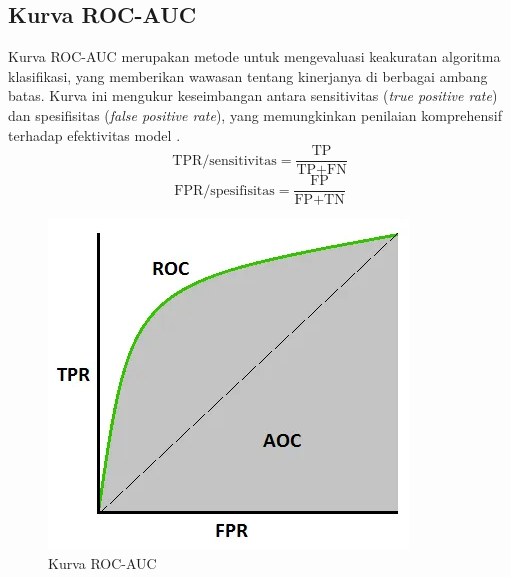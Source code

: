     \subsection{Kurva ROC-AUC}
    Kurva ROC-AUC merupakan metode untuk mengevaluasi keakuratan algoritma klasifikasi, yang memberikan wawasan tentang kinerjanya di berbagai ambang batas. Kurva ini mengukur keseimbangan antara sensitivitas (\textit{true positive rate}) dan spesifisitas (\textit{false positive rate}), yang memungkinkan penilaian komprehensif terhadap efektivitas model \cite{10420319}.
\begin{equation}
   \text{TPR/sensitivitas} = \frac{\text{TP}}{\text{TP} + \text{FN}}
   \label{eq:tpr}
\end{equation}
\begin{equation}
   \text{FPR/spesifisitas} = \frac{\text{FP}}{\text{FP} + \text{TN}}
   \label{eq:fpr}
\end{equation}
\begin{figure}[H]
    \centering
    \includegraphics[width=0.4\linewidth]{gambar/ROC-AUC.png}
    \caption{Kurva ROC-AUC}
    \label{fig:roc_auc}
\end{figure}

